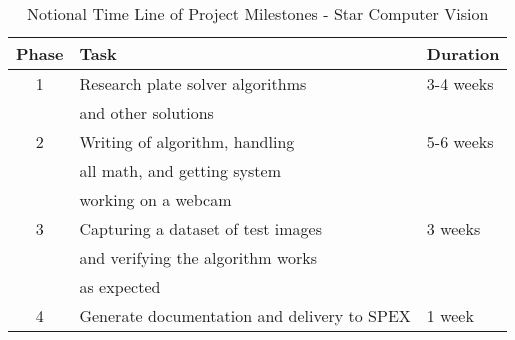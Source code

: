 \documentclass[conference]{IEEEtran} %
\begin{document}
\begin{table}[h!]
    \caption{Notional Time Line of Project Milestones - Star Computer Vision}
    \centering
    \begin{tabular}{@{}cll@{}}
    \toprule
    Phase & Task & Duration \\
    \midrule
    1 & Research plate solver algorithms & 3-4 weeks\\
    & and other solutions \\
    2 & Writing of algorithm, handling & 5-6 weeks \\ 
    & all math, and getting system \\
    & working on a webcam \\
    3 & Capturing a dataset of test images & 3 weeks \\
    & and verifying the algorithm works\\
    & as expected \\
    4 & Generate documentation and delivery to SPEX & 1 week  \\
    \bottomrule
    \end{tabular}
\label{tab:computervis}
\end{table}
\end{document}
